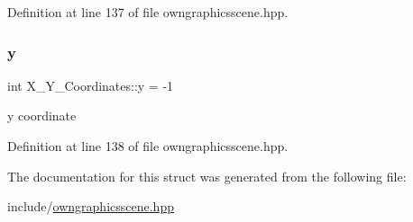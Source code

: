 Definition at line 137 of file owngraphicsscene.\+hpp.

\mbox{\label{structX__Y__Coordinates_a4a608b81d10b65d5b12596ca82df34f6}} 
\subsubsection{\texorpdfstring{y}{y}}
{\footnotesize\ttfamily int X\+\_\+\+Y\+\_\+\+Coordinates\+::y = -\/1}

y coordinate 

Definition at line 138 of file owngraphicsscene.\+hpp.



The documentation for this struct was generated from the following file\+:\begin{DoxyCompactItemize}
\item 
include/\mbox{\hyperlink{owngraphicsscene_8hpp}{owngraphicsscene.\+hpp}}\end{DoxyCompactItemize}
